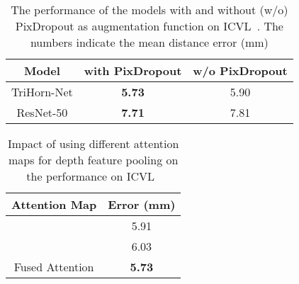 \documentclass{article}
\begin{document}
\begin{table}
\caption{The performance of the models with and without (w/o) PixDropout as augmentation function on ICVL~\cite{tang2014latent}. The numbers indicate the mean distance error (mm)}
\centering
\setlength{\tabcolsep}{10pt}
\renewcommand{\arraystretch}{1.05}
\begin{tabular}{ccc}
            \hline
            Model & with PixDropout    &   w/o PixDropout       \\
            \hline
                TriHorn-Net          &         \textbf{5.73}     &  5.90    \\
                ResNet-50            &         \textbf{7.71}     &  7.81     \\

            \hline
        \end{tabular}
\label{tab:PixDropout}
\end{table}
\begin{table}[t]
\caption{Impact of using different attention maps for depth feature pooling on the performance on ICVL~\cite{tang2014latent}}
\centering
\setlength{\tabcolsep}{10pt}
\renewcommand{\arraystretch}{1.05}
\begin{tabular}{cc}
            \hline
            Attention Map    &   Error (mm)       \\
            \hline
                           &         5.91   \\
                            &         6.03  \\
                Fused Attention            &        \textbf{5.73}  \\


            \hline
        \end{tabular}
\label{tab:attention}
\end{table}
  
\end{document}
